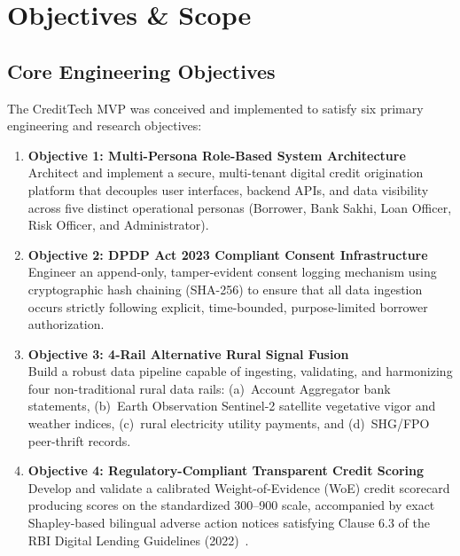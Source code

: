 \chapter{Objectives \& Scope}
\label{chap:objectives_scope}

\section{Core Engineering Objectives}
The CreditTech MVP was conceived and implemented to satisfy six primary engineering and research objectives:

\begin{enumerate}
  \item \textbf{Objective 1: Multi-Persona Role-Based System Architecture}\\
  Architect and implement a secure, multi-tenant digital credit origination platform that decouples user interfaces, backend APIs, and data visibility across five distinct operational personas (Borrower, Bank Sakhi, Loan Officer, Risk Officer, and Administrator).
  
  \item \textbf{Objective 2: DPDP Act 2023 Compliant Consent Infrastructure}\\
  Engineer an append-only, tamper-evident consent logging mechanism using cryptographic hash chaining (SHA-256) to ensure that all data ingestion occurs strictly following explicit, time-bounded, purpose-limited borrower authorization.

  \item \textbf{Objective 3: 4-Rail Alternative Rural Signal Fusion}\\
  Build a robust data pipeline capable of ingesting, validating, and harmonizing four non-traditional rural data rails: (a)~Account Aggregator bank statements, (b)~Earth Observation Sentinel-2 satellite vegetative vigor and weather indices, (c)~rural electricity utility payments, and (d)~SHG/FPO peer-thrift records.

  \item \textbf{Objective 4: Regulatory-Compliant Transparent Credit Scoring}\\
  Develop and validate a calibrated Weight-of-Evidence (WoE) credit scorecard producing scores on the standardized 300--900 scale, accompanied by exact Shapley-based bilingual adverse action notices satisfying Clause 6.3 of the RBI Digital Lending Guidelines (2022)~\cite{rbi_dlg_2022}.


\end{enumerate}

